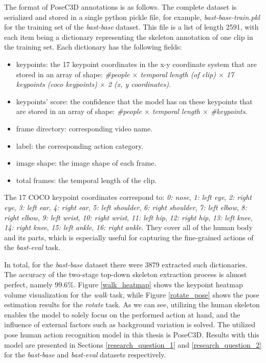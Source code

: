 \documentclass[extern,palatino]{cgMA}
\begin{document}
\bigskip
\noindent The format of PoseC3D annotations is as follows. The complete dataset is serialized and stored in a single python pickle file, for example, \textit{bast-base-train.pkl} for the training set of the \textit{bast-base} dataset. This file is a list of length 2591, with each item being a dictionary representing the skeleton annotation of one clip in the training set. Each dictionary has the following fields:

\begin{itemize}
    \item keypoints: the 17 keypoint coordinates in the x-y coordinate system that are stored in an array of shape: \textit{\#people $\times$ temporal length (of clip) $\times$ 17 keypoints (coco keypoints) $\times$ 2 (x, y coordinates)}.
    \item keypoints' score: the confidence that the model has on these keypoints that are stored in an array of shape: \textit{\#people $\times$ temporal length $\times$ \#keypoints}.
    \item frame directory: corresponding video name.
    \item label: the corresponding action category.
    \item image shape: the image shape of each frame.
    \item total frames: the temporal length of the clip.
\end{itemize}

\noindent The 17 COCO keypoint coordinates correspond to: \textit{0: nose}, \textit{1: left eye}, \textit{2: right eye}, \textit{3: left ear},  \textit{4: right ear}, \textit{5: left shoulder}, \textit{6: right shoulder}, \textit{7: left elbow}, \textit{8: right elbow}, \textit{9: left wrist}, \textit{10: right wrist}, \textit{11: left hip}, \textit{12: right hip}, \textit{13: left knee}, \textit{14: right knee}, \textit{15: left ankle}, \textit{16: right ankle}. They cover all of the human body and its parts, which is especially useful for capturing the fine-grained actions of the \textit{bast-eval} task.

\bigskip
\noindent In total, for the \textit{bast-base} dataset there were 3879 extracted such dictionaries. The accuracy of the two-stage top-down skeleton extraction process is almost perfect, namely $99.6\%$. Figure \ref{walk_heatmap} shows the keypoint heatmap volume visualization for the \textit{walk} task, while Figure \ref{rotate_pose} shows the pose estimation results for the \textit{rotate} task. As we can see, utilizing the human skeleton enables the model to solely focus on the performed action at hand, and the influence of external factors such as background variation is solved. The utilized pose human action recognition model in this thesis is PoseC3D. Results with this model are presented in Sections \ref{research_question_1} and \ref{research_question_2} for the \textit{bast-base} and \textit{bast-eval} datasets respectively.
\end{document}
